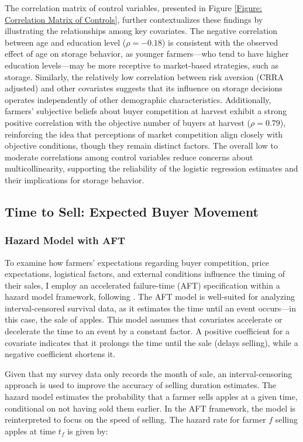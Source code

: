 The correlation matrix of control variables, presented in Figure \ref{Figure: Correlation Matrix of Controls}, further contextualizes these findings by illustrating the relationships among key covariates. The negative correlation between age and education level ($\rho = -0.18$) is consistent with the observed effect of age on storage behavior, as younger farmers---who tend to have higher education levels---may be more receptive to market-based strategies, such as storage. Similarly, the relatively low correlation between risk aversion (CRRA adjusted) and other covariates suggests that its influence on storage decisions operates independently of other demographic characteristics. Additionally, farmers' subjective beliefs about buyer competition at harvest exhibit a strong positive correlation with the objective number of buyers at harvest ($\rho = 0.79$), reinforcing the idea that perceptions of market competition align closely with objective conditions, though they remain distinct factors. The overall low to moderate correlations among control variables reduce concerns about multicollinearity, supporting the reliability of the logistic regression estimates and their implications for storage behavior.



\subsection{Time to Sell: Expected Buyer Movement}


\subsubsection{Hazard Model with AFT}
\noindent 
To examine how farmers' expectations regarding buyer competition, price expectations, logistical factors, and external conditions influence the timing of their sales, I employ an accelerated failure-time (AFT) specification within a hazard model framework, following \cite{albuquerque2024market}. The AFT model is well-suited for analyzing interval-censored survival data, as it estimates the time until an event occurs---in this case, the sale of apples. This model assumes that covariates accelerate or decelerate the time to an event by a constant factor. A positive coefficient for a covariate indicates that it prolongs the time until the sale (delays selling), while a negative coefficient shortens it.

Given that my survey data only records the month of sale, an interval-censoring approach is used to improve the accuracy of selling duration estimates. The hazard model estimates the probability that a farmer sells apples at a given time, conditional on not having sold them earlier. In the AFT framework, the model is reinterpreted to focus on the speed of selling. The hazard rate for farmer $f$ selling apples at time $t_{f}$ is given by:

